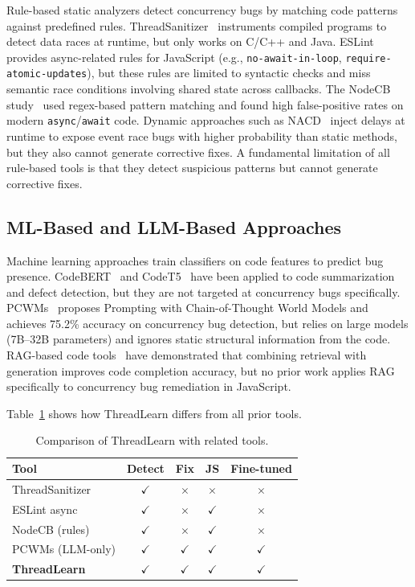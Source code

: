 \documentclass[runningheads]{llncs}
\begin{document}
Rule-based static analyzers detect concurrency bugs by matching code
patterns against predefined rules.
ThreadSanitizer~\cite{threadsanitizer} instruments compiled programs to
detect data races at runtime, but only works on C/C++ and Java.
ESLint~\cite{eslint} provides async-related rules for JavaScript (e.g., \texttt{no-await-in-loop},
\texttt{require-atomic-updates}), but these rules are limited to syntactic
checks and miss semantic race conditions involving shared state across
callbacks.
The NodeCB study~\cite{nodecb2017} used regex-based pattern matching and
found high false-positive rates on modern \texttt{async}/\texttt{await} code.
Dynamic approaches such as NACD~\cite{nacd2025} inject delays at runtime to
expose event race bugs with higher probability than static methods, but they
also cannot generate corrective fixes.
A fundamental limitation of all rule-based tools is that they detect
suspicious patterns but cannot generate corrective fixes.

\subsection{ML-Based and LLM-Based Approaches}
\label{sec:related:ml}

Machine learning approaches train classifiers on code features to predict
bug presence.
CodeBERT~\cite{codebert} and CodeT5~\cite{codet5} have been applied to
code summarization and defect detection, but they are not targeted at
concurrency bugs specifically.
PCWMs~\cite{pcwms2026} proposes Prompting with Chain-of-Thought World
Models and achieves 75.2\% accuracy on concurrency bug detection, but
relies on large models (7B--32B parameters) and ignores static structural
information from the code.
RAG-based code tools~\cite{rag_survey} have demonstrated that combining
retrieval with generation improves code completion accuracy, but no prior
work applies RAG specifically to concurrency bug remediation in JavaScript.

Table~\ref{tab:related} shows how ThreadLearn differs from all prior tools.

\begin{table}[H]
  \centering
  \caption{Comparison of ThreadLearn with related tools.}
  \label{tab:related}
  \begin{tabular}{@{}lcccc@{}}
    \toprule
    \textbf{Tool} & \textbf{Detect} & \textbf{Fix} & \textbf{JS} & \textbf{Fine-tuned} \\
    \midrule
    ThreadSanitizer      & $\checkmark$ & $\times$     & $\times$     & $\times$ \\
    ESLint async         & $\checkmark$ & $\times$     & $\checkmark$ & $\times$ \\
    NodeCB (rules)       & $\checkmark$ & $\times$     & $\checkmark$ & $\times$ \\
    PCWMs (LLM-only)     & $\checkmark$ & $\checkmark$ & $\checkmark$ & $\checkmark$ \\
    \textbf{ThreadLearn} & $\checkmark$ & $\checkmark$ & $\checkmark$ & $\checkmark$ \\
    \bottomrule
  \end{tabular}
\end{table}
\end{document}
